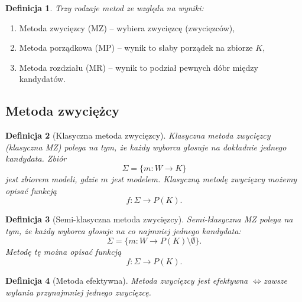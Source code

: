 \documentclass[12pt,a4paper]{article}
\theoremstyle{break}
\newtheorem{definition}{Definicja}[section]
\newcommand{\witw}{$\Leftrightarrow$}
\begin{document}
\begin{definition}
	Trzy rodzaje metod ze względu na wyniki:
\end{definition}

\begin{enumerate}[1)]
	\item Metoda zwycięzcy (MZ) – wybiera zwycięzcę (zwycięzców),
	\item Metoda porządkowa (MP) – wynik to słaby porządek na zbiorze $K$,
	\item Metoda rozdziału (MR) – wynik to podział pewnych dóbr między kandydatów.
\end{enumerate}
\subsection{Metoda zwyciężcy}
\begin{definition}[Klasyczna metoda zwycięzcy]
	Klasyczna metoda zwycięzcy (klasyczna MZ) polega na tym, że każdy wyborca głosuje na dokładnie jednego kandydata. Zbiór
	$$\Sigma = \{m:W\rightarrow K\}$$
	jest zbiorem modeli, gdzie $m$ jest modelem. Klasyczną metodę zwycięzcy możemy opisać funkcją
	$$f: \Sigma \rightarrow P(K).$$
\end{definition}

\begin{definition}[Semi-klasyczna metoda zwycięzcy]
	Semi-klasyczna MZ polega na tym, że każdy wyborca głosuje na co najmniej jednego kandydata:
	$$\Sigma = \{m:W\rightarrow P(K)\setminus \emptyset\}.$$
	Metodę tę można opisać funkcją
	$$f: \Sigma \rightarrow P(K).$$
\end{definition}

\begin{definition}[Metoda efektywna]
	Metoda zwycięzcy jest efektywna \witw zawsze wyłania przynajmniej jednego zwycięzcę.
\end{definition}
\end{document}
